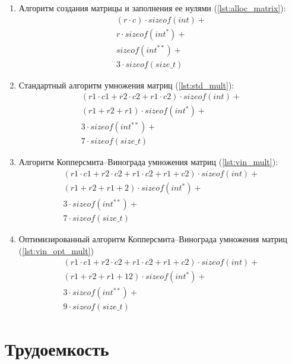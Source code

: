 \begin{enumerate}
    \item Алгоритм создания матрицы и заполнения ее нулями (\ref{lst:alloc_matrix}):
    \begin{eqnarray*}
        (r \cdot c) \cdot sizeof(int) + \\
        r \cdot sizeof(int^{*}) + \\
        sizeof(int^{**}) + \\
        3 \cdot sizeof(size\_t)
    \end{eqnarray*}
    \item Стандартный алгоритм умножения матриц (\ref{lst:std_mult}):
    \begin{eqnarray*}
        (r1 \cdot c1 + r2 \cdot c2 + r1 \cdot c2) \cdot sizeof(int) + \\
        (r1 + r2 + r1) \cdot sizeof(int^{*}) + \\
        3 \cdot sizeof(int^{**}) + \\
        7 \cdot sizeof(size\_t)
    \end{eqnarray*}
    \item Алгоритм Копперсмита--Винограда умножения матриц (\ref{lst:vin_mult}):
    \begin{eqnarray*}
        (r1 \cdot c1 + r2 \cdot c2 + r1 \cdot c2 + r1 + c2) \cdot sizeof(int) + \\
        (r1 + r2 + r1 + 2) \cdot sizeof(int^{*}) + \\
        3 \cdot sizeof(int^{**}) + \\
        7 \cdot sizeof(size\_t)
    \end{eqnarray*}
    \item Оптимизированный алгоритм Копперсмита--Винограда умножения матриц (\ref{lst:vin_opt_mult})
    \begin{eqnarray*}
        (r1 \cdot c1 + r2 \cdot c2 + r1 \cdot c2 + r1 + c2) \cdot sizeof(int) + \\
        (r1 + r2 + r1 + 12) \cdot sizeof(int^{*}) + \\
        3 \cdot sizeof(int^{**}) + \\
        9 \cdot sizeof(size\_t)
    \end{eqnarray*}
\end{enumerate}

\section{Трудоемкость}

